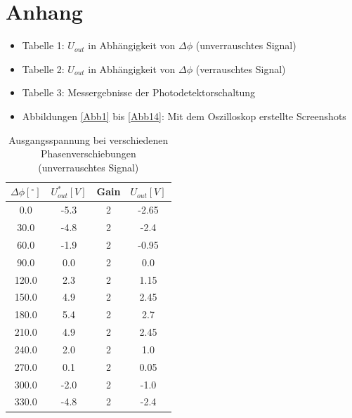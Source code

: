 \documentclass[11pt]{article}
\begin{document}
\section{Anhang}
\begin{itemize}
\item Tabelle 1: $U_{out}$ in Abhängigkeit von $\Delta\phi$ (unverrauschtes Signal)
\item Tabelle 2: $U_{out}$ in Abhängigkeit von $\Delta\phi$ (verrauschtes Signal)
\item Tabelle 3: Messergebnisse der Photodetektorschaltung
\item Abbildungen \ref{Abb1} bis \ref{Abb14}: Mit dem Oszilloskop erstellte Screenshots
 
\end{itemize}
\newpage

\begin{table}[h!]
\centering
\begin{tabular}{|c|c|c|c|}
\hline
$\Delta \phi [^\circ]$ & $U_{out}^* [V]$ & Gain & $U_{out} [V]$ \\
\hline
0.0 & -5.3 & 2 & -2.65\\
30.0 & -4.8 & 2 &-2.4\\
60.0 & -1.9 & 2 &-0.95\\
90.0 & 0.0 & 2 &0.0\\
120.0 & 2.3 & 2 &1.15\\
150.0 & 4.9 & 2 &2.45\\
180.0 & 5.4 & 2 &2.7\\
210.0 & 4.9 & 2 &2.45\\
240.0 & 2.0 & 2 &1.0\\
270.0 & 0.1 & 2 &0.05\\
300.0 & -2.0 & 2 &-1.0\\
330.0 & -4.8 & 2 &-2.4\\
\hline
\end{tabular}
\label{data1}
\caption{Ausgangsspannung bei verschiedenen Phasenverschiebungen \newline (unverrauschtes Signal)}
\end{table}
\end{document}
